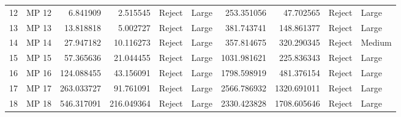 \begin{tabular}{llrrllrrll}
12 &  MP 12 &           6.841909 &            2.515545 &   Reject &       Large &               253.351056 &                 47.702565 &   Reject &       Large \\
13 &  MP 13 &          13.818818 &            5.002727 &   Reject &       Large &               381.743741 &                148.861377 &   Reject &       Large \\
14 &  MP 14 &          27.947182 &           10.116273 &   Reject &       Large &               357.814675 &                320.290345 &   Reject &      Medium \\
15 &  MP 15 &          57.365636 &           21.044455 &   Reject &       Large &              1031.981621 &                225.836343 &   Reject &       Large \\
16 &  MP 16 &         124.088455 &           43.156091 &   Reject &       Large &              1798.598919 &                481.376154 &   Reject &       Large \\
17 &  MP 17 &         263.033727 &           91.761091 &   Reject &       Large &              2566.786932 &               1320.691011 &   Reject &       Large \\
18 &  MP 18 &         546.317091 &          216.049364 &   Reject &       Large &              2330.423828 &               1708.605646 &   Reject &       Large \\
\bottomrule
\end{tabular}
